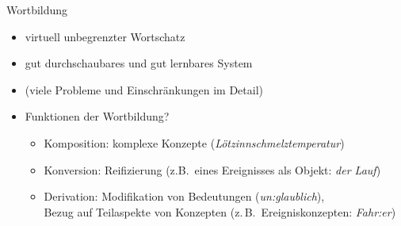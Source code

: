 \begin{frame}
  {Wortbildung}
  \pause
  \begin{itemize}[<+->]
    \item virtuell\rot{(!)} unbegrenzter Wortschatz
      \Zeile
    \item gut durchschaubares und \alert{gut lernbares} System
    \item (viele Probleme und Einschränkungen im Detail)
      \Zeile
    \item Funktionen der Wortbildung?
      \Halbzeile
      \begin{itemize}
        \item Komposition: \alert{komplexe Konzepte} (\textit{Lötzinnschmelztemperatur})
          \Halbzeile
        \item Konversion: \alert{Reifizierung} (z.B.\ eines Ereignisses als Objekt: \textit{der Lauf})
          \Halbzeile
        \item Derivation: \alert{Modifikation von Bedeutungen} (\textit{un:glaublich}),\\
          \alert{Bezug auf Teilaspekte von Konzepten} (z.\,B.\ Ereigniskonzepten: \textit{Fahr:er})
      \end{itemize}
  \end{itemize}
\end{frame}

